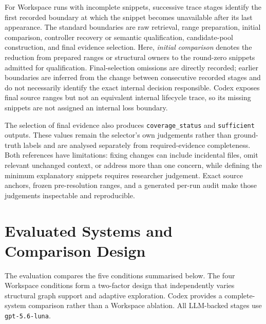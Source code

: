 For Workspace runs with incomplete snippets, successive trace stages identify the first recorded boundary at which the snippet becomes unavailable after its last appearance. The standard boundaries are raw retrieval, range preparation, initial comparison, controller recovery or semantic qualification, candidate-pool construction, and final evidence selection. Here, \emph{initial comparison} denotes the reduction from prepared ranges or structural owners to the round-zero snippets admitted for qualification. Final-selection omissions are directly recorded; earlier boundaries are inferred from the change between consecutive recorded stages and do not necessarily identify the exact internal decision responsible. Codex exposes final source ranges but not an equivalent internal lifecycle trace, so its missing snippets are not assigned an internal loss boundary.

The selection of final evidence also produces \texttt{coverage\_status} and \texttt{sufficient} outputs. These values remain the selector's own judgements rather than ground-truth labels and are analysed separately from required-evidence completeness. Both references have limitations: fixing changes can include incidental files, omit relevant unchanged context, or address more than one concern, while defining the minimum explanatory snippets requires researcher judgement. Exact source anchors, frozen pre-resolution ranges, and a generated per-run audit make those judgements inspectable and reproducible.

\section{Evaluated Systems and Comparison Design}\label{sec:evaluated-systems-and-comparison-design}

The evaluation compares the five conditions summarised below. The four Workspace conditions form a two-factor design that independently varies structural graph support and adaptive exploration. Codex provides a complete-system comparison rather than a Workspace ablation. All LLM-backed stages use \texttt{gpt-5.6-luna}.

